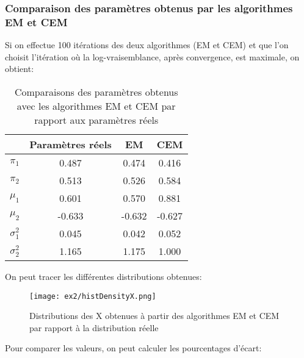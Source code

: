 \documentclass{article}
\begin{document}
\begin{multicols}{2}
\subsubsection{Comparaison des paramètres obtenus par les algorithmes EM et CEM}\label{subsubsec:ex213}

Si on effectue 100 itérations des deux algorithmes (EM et CEM) et que l'on
choisit l'itération où la log-vraisemblance, après convergence, est maximale, on
obtient:

\begin{table}[H]
\begin{center}
    \centering
    \captionsetup{justification=centering}
    \caption{\label{tab:paramComparison}Comparaisons des paramètres obtenus avec les algorithmes EM et CEM par rapport aux paramètres réels}
    \begin{tabular}{|c|c|c|c|}
        \hline
        & Paramètres réels & EM & CEM \\
        \hline
        $\pi_1$ & 0.487 & 0.474 & 0.416 \\
        \hline
        $\pi_2$ & 0.513 & 0.526 & 0.584 \\
        \hline
        $\mu_1$ & 0.601 & 0.570 & 0.881 \\
        \hline
        $\mu_2$ & -0.633 & -0.632 & -0.627 \\
        \hline
        $\sigma_1^2$ & 0.045 & 0.042 & 0.052 \\
        \hline
        $\sigma_2^2$ & 1.165 & 1.175 & 1.000 \\
        \hline
    \end{tabular}
\end{center}
\end{table}

On peut tracer les différentes distributions obtenues:

\begin{figure}[H]
\begin{center}
    \texttt{[image: ex2/histDensityX.png]}
    \centering
    \captionsetup{justification=centering}
    \caption{\label{fig:distX}Distributions des X obtenues à partir des algorithmes EM et CEM par rapport à la distribution réelle}
\end{center}
\end{figure}

Pour comparer les valeurs, on peut calculer les pourcentages d'écart:


\end{multicols}
\end{document}
